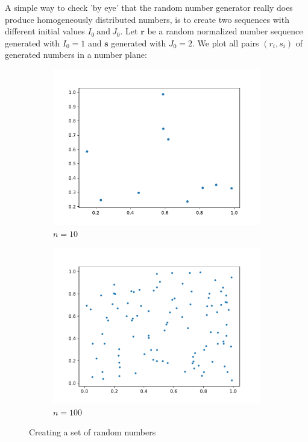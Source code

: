 \documentclass{article}
\begin{document}
A simple way to check 'by eye' that the random number generator really does
produce homogeneously distributed numbers, is to create two sequences with
different initial values \( I_0 \ \text{and} \ J_0 \). 
Let \( \mathbf{r} \) be a random normalized number sequence generated with
\( I_0 = 1 \) and \( \mathbf{s} \) generated with \( J_0 = 2 \).
We plot all pairs \( (r_i, s_i) \) of generated numbers in a number plane:
\begin{figure}[H]
    \centering
    \begin{subfigure}[b]{0.49\linewidth}
	\centering
	\includegraphics[width=\textwidth]{Fig1-1.pdf} 
	\caption{$n=10$} 
    \end{subfigure}
    \begin{subfigure}[b]{0.49\linewidth}
	\centering
	\includegraphics[width=\textwidth]{Fig1-2.pdf} 
	\caption{$n=100$} 
    \end{subfigure}
    \caption{Creating a set of random numbers}
\end{figure}
\end{document}
